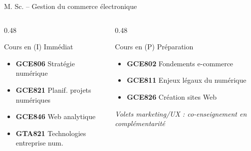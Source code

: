\documentclass[aspectratio=169,11pt]{beamer}
\begin{document}
\begin{frame}{M. Sc. -- Gestion du commerce électronique}
  \small
  \begin{columns}[T]
    \begin{column}{0.48\textwidth}
      \begin{block}{Cours en (I) Immédiat}
        \begin{itemize}
          \item[\textcolor{immediatgreen}{I}] \textbf{GCE806} Stratégie numérique
          \item[\textcolor{immediatgreen}{I}] \textbf{GCE821} Planif. projets numériques
          \item[\textcolor{immediatgreen}{I}] \textbf{GCE846} Web analytique
          \item[\textcolor{immediatgreen}{I}] \textbf{GTA821} Technologies entreprise num.
        \end{itemize}
      \end{block}
    \end{column}
    \begin{column}{0.48\textwidth}
      \begin{block}{Cours en (P) Préparation}
        \begin{itemize}
          \item[\textcolor{prepareorange}{P}] \textbf{GCE802} Fondements e-commerce
          \item[\textcolor{prepareorange}{P}] \textbf{GCE811} Enjeux légaux du numérique
          \item[\textcolor{prepareorange}{P}] \textbf{GCE826} Création sites Web
        \end{itemize}
      \end{block}
      
      \vspace{0.3em}
      
      {\small \textit{Volets marketing/UX : co-enseignement en complémentarité}}
    \end{column}
  \end{columns}
  
  \vspace{0.3em}
  
  \begin{center}
  \end{center}
\end{frame}
\end{document}
